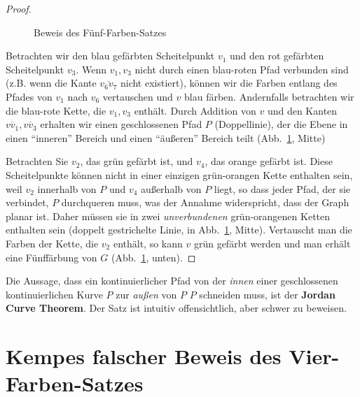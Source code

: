 \begin{proof}
\begin{figure}
\begin{center}
\end{center}
\caption{Beweis des Fünf-Farben-Satzes}\label{f.five-color-proof}
\end{figure}

Betrachten wir den blau gefärbten Scheitelpunkt $v_1$ und den rot gefärbten Scheitelpunkt $v_3$. Wenn $v_1,v_3$ nicht durch einen blau-roten Pfad verbunden sind (z.B. wenn die Kante $\overline{v_6v_7}$ nicht existiert), können wir die Farben entlang des Pfades von $v_1$ nach $v_6$ vertauschen und $v$ blau färben. Andernfalls betrachten wir die blau-rote Kette, die $v_1,v_3$ enthält. Durch Addition von $v$ und den Kanten $\overline{vv_1},\overline{vv_3}$ erhalten wir einen geschlossenen Pfad $P$ (Doppellinie), der die Ebene in einen ``inneren'' Bereich und einen ``äußeren'' Bereich teilt (Abb.~\ref{f.five-color-proof}, Mitte)

Betrachten Sie $v_2$, das grün gefärbt ist, und $v_4$, das orange gefärbt ist. Diese Scheitelpunkte können nicht in einer einzigen grün-orangen Kette enthalten sein, weil $v_2$ innerhalb von $P$ und $v_4$ außerhalb von $P$ liegt, so dass jeder Pfad, der sie verbindet, $P$ durchqueren muss, was der Annahme widerspricht, dass der Graph planar ist. Daher müssen sie in zwei \emph{unverbundenen} grün-orangenen Ketten enthalten sein (doppelt gestrichelte Linie, in Abb.~\ref{f.five-color-proof}, Mitte).
Vertauscht man die Farben der Kette, die $v_2$ enthält, so kann $v$ grün gefärbt werden und man erhält eine Fünffärbung von $G$ (Abb.~\ref{f.five-color-proof}, unten).
\end{proof}

\begin{advanced}
Die Aussage, dass ein kontinuierlicher Pfad von der \emph{innen} einer geschlossenen kontinuierlichen Kurve $P$ zur \emph{außen} von $P$ $P$ schneiden muss, ist der \textbf{Jordan Curve Theorem}. Der Satz ist intuitiv offensichtlich, aber schwer zu beweisen.
\end{advanced}

\section{Kempes falscher Beweis des Vier-Farben-Satzes}\label{s.kempe}

